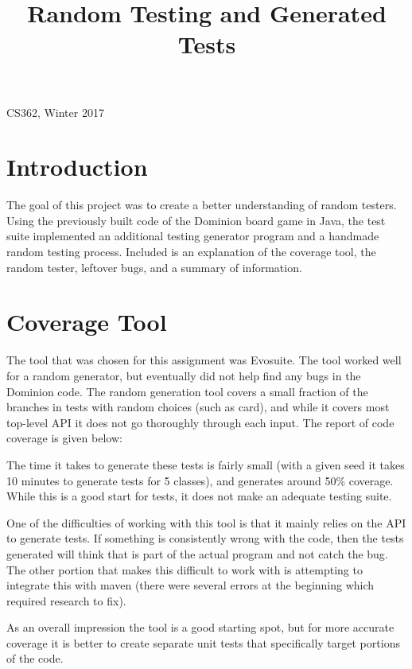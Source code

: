 \documentclass[letterpaper,10pt,onecolumn,draftclsnofoot]{IEEEtran}
\title{Random Testing and Generated Tests}
\author{\name}
\def\class{CS362, Winter 2017}
\begin{document}
\clearpage
\maketitle
\thispagestyle{empty} %
\vspace{-10ex}
{\centering \class \par}

\section{Introduction}
The goal of this project was to create a better understanding of random testers. Using the previously built code of the Dominion board game in Java, the test suite implemented an additional testing generator program and a handmade random testing process. Included is an explanation of the coverage tool, the random tester, leftover bugs, and a summary of information.

\section{Coverage Tool}
The tool that was chosen for this assignment was Evosuite. The tool worked well for a random generator, but eventually did not help find any bugs in the Dominion code. The random generation tool covers a small fraction of the branches in tests with random choices (such as card), and while it covers most top-level API it does not go thoroughly through each input. The report of code coverage is given below:


The time it takes to generate these tests is fairly small (with a given seed it takes 10 minutes to generate tests for 5 classes), and generates around 50\% coverage. While this is a good start for tests, it does not make an adequate testing suite.

One of the difficulties of working with this tool is that it mainly relies on the API to generate tests. If something is consistently wrong with the code, then the tests generated will think that is part of the actual program and not catch the bug. The other portion that makes this difficult to work with is attempting to integrate this with maven (there were several errors at the beginning which required research to fix).

As an overall impression the tool is a good starting spot, but for more accurate coverage it is better to create separate unit tests that specifically target portions of the code.
\end{document}
